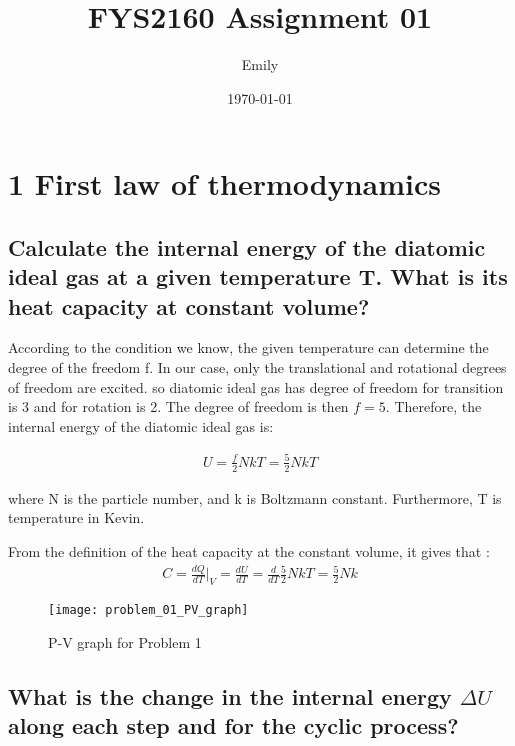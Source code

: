 \documentclass[a4paper,11pt]{article}
\begin{document}
	
	
\title{FYS2160 Assignment 01}
\author{Emily}
\date{\today}


\maketitle

\section{1 First law of thermodynamics}
\subsection[1.1]{Calculate the internal energy of the diatomic ideal gas at a given temperature T. What is its heat capacity at constant volume?}

According to the condition we know, the given temperature can determine the degree of the freedom f. In our case, only the translational and rotational degrees of freedom are excited. so diatomic ideal gas has degree of freedom for transition is 3 and for rotation is 2. The degree of freedom is then $f = 5$. Therefore, the internal energy of the diatomic ideal gas is:

\begin{align*}
U = \frac{f}{2}NkT = \frac{5}{2}NkT 
\end{align*}

where N is the particle number,  and k is Boltzmann constant. Furthermore, T is temperature in Kevin.
 
From the definition of the heat capacity at the constant volume, it gives that :
\begin{align*}
C = \frac{dQ}{dT}|_V = \frac{dU}{dT}
=  \frac{d}{dT}\frac{5}{2}NkT 
= \frac{5}{2}Nk
\end{align*}

\begin{comment}
The ideal gas states that  $PV = NkT$,  it can derive that 
\end{comment}

\begin{figure}[H]
	\centering
	\texttt{[image: problem\_01\_PV\_graph]}
	\caption{P-V graph for Problem 1}
	\label{fig:problem01pvgraph}
\end{figure}

\subsection[1.2]{What is the change in the internal energy $\Delta U$ along each step and for the cyclic process?}
\end{document}
